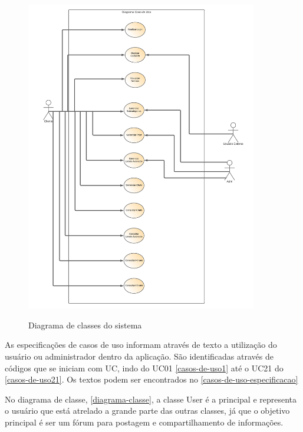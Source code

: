 \pagebreak

\begin{figure}[htb]
	\centering
	\caption{\label{fig_arq_virado}Diagrama de classes do sistema}
	\includegraphics[width=0.90\textwidth]{anexos/Diagrama_em_branco.png}
	\label{diagrama-caso-uso}
\end{figure}


As especificações de casos de uso informam através de texto a utilização do usuário ou administrador dentro da aplicação. São identificadas através de códigos que se iniciam com UC, indo do
UC01 \autoref{casos-de-uso1} até o UC21 do \autoref{casos-de-uso21}. Os textos podem ser encontrados no \autoref{casos-de-uso-especificacao}

No diagrama de classe,  \autoref{diagrama-classe}, a classe User é a principal e representa o usuário que está atrelado a grande parte das outras classes, já que o objetivo principal é ser um fórum para postagem e compartilhamento de informações. 



